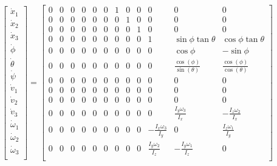 \documentclass{article}
\begin{document}
\begin{equation}
    \begin{aligned}
        \begin{bmatrix}
            \dot{x}_1 \\ \dot{x}_2 \\ \dot{x}_3 \\
            \dot{\phi} \\ \dot{\theta} \\ \dot{\psi} \\
            \dot{v}_1 \\ \dot{v}_2 \\ \dot{v}_3 \\
            \dot{\omega}_1 \\ \dot{\omega}_2 \\ \dot{\omega}_3 \\
        \end{bmatrix}
        = 
        \begin{bmatrix}
            0 & 0 & 0 & 0 & 0 & 0 & 1 & 0 & 0 & 0 & 0 & 0 \\
            0 & 0 & 0 & 0 & 0 & 0 & 0 & 1 & 0 & 0 & 0 & 0 \\
            0 & 0 & 0 & 0 & 0 & 0 & 0 & 0 & 1 & 0 & 0 & 0 \\
            0 & 0 & 0 & 0 & 0 & 0 & 0 & 0 & 0 & 1 & \sin{\phi}\tan{\theta} & \cos{\phi}\tan{\theta} \\
            0 & 0 & 0 & 0 & 0 & 0 & 0 & 0 & 0 & 0 & \cos{\phi} & -\sin{\phi} \\
            0 & 0 & 0 & 0 & 0 & 0 & 0 & 0 & 0 & 0 & \frac{\cos(\phi)}{\sin(\theta)} & \frac{\cos(\phi)}{\cos(\theta)} \\
            0 & 0 & 0 & 0 & 0 & 0 & 0 & 0 & 0 & 0 & 0 & 0 \\
            0 & 0 & 0 & 0 & 0 & 0 & 0 & 0 & 0 & 0 & 0 & 0 \\
            0 & 0 & 0 & 0 & 0 & 0 & 0 & 0 & 0 & 0 & 0 & 0 \\
            0 & 0 & 0 & 0 & 0 & 0 & 0 & 0 & 0 & 0 & \frac{I_y \omega_3}{I_x} & -\frac{I_z \omega_2}{I_x} \\
            0 & 0 & 0 & 0 & 0 & 0 & 0 & 0 & 0 & -\frac{I_x \omega_3}{I_y} & 0 & \frac{I_z \omega_1}{I_y} \\
            0 & 0 & 0 & 0 & 0 & 0 & 0 & 0 & 0 & \frac{I_y \omega_2}{I_z} & -\frac{I_y \omega_1}{I_z} & 0 \\
        \end{bmatrix}

\end{aligned}
\end{equation}
\end{document}
